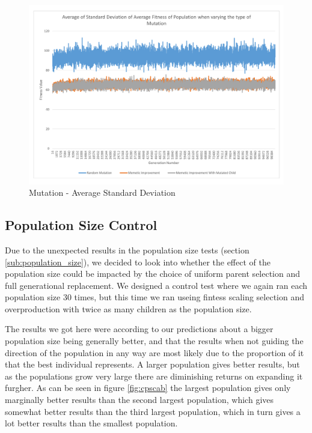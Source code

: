 \begin{figure}[thbp]
	\centerline{\includegraphics[width=\paperwidth]{figures/CircleTests/Mutation/CircleTestMutationAverageStandardDeviation.pdf}}
	\caption{Mutation - Average Standard Deviation}
	\label{fig:ctmasd}
\end{figure}


\clearpage

\subsection{Population Size Control} %
\label{sub:population_size_control}

Due to the unexpected results in the population size tests (section \ref{sub:population_size}), we decided to look into whether the effect of the population size could be impacted by the choice of uniform parent selection and full generational replacement. We designed a control test where we again ran each population size 30 times, but this time we ran useing fintess scaling selection and overproduction with twice as many children as the population size.

The results we got here were according to our predictions about a bigger population size being generally better, and that the results when not guiding the direction of the population in any way are most likely due to the proportion of it that the best individual represents. A larger population gives better results, but as the populations grow very large there are diminishing returns on expanding it furgher. As can be seen in figure \ref{fig:cpscab} the largest population gives only marginally better results than the second largest population, which gives somewhat better results than the third largest population, which in turn gives a lot better results than the smallest population.

